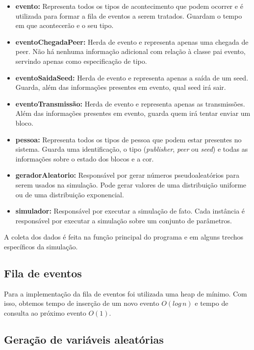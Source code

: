 \documentclass[a4paper,10pt]{article}
\begin{document}
\begin{itemize}
	\item \textbf{evento:} Representa todos os tipos de acontecimento que podem ocorrer e é utilizada para formar a fila de eventos a serem tratados. Guardam o tempo em que acontecerão e o seu tipo.
	\item \textbf{eventoChegadaPeer:} Herda de evento e representa apenas uma chegada de peer. Não há nenhuma informação adicional com relação à classe pai evento, servindo apenas como especificação de tipo.
	\item \textbf{eventoSaidaSeed:} Herda de evento e representa apenas a saída de um seed. Guarda, além das informações presentes em evento, qual seed irá sair.
	\item \textbf{eventoTransmissão:} Herda de evento e representa apenas as transmissões. Além das informações presentes em evento, guarda quem irá tentar enviar um bloco.
	\item \textbf{pessoa:} Representa todos os tipos de pessoa que podem estar presentes no sistema. Guarda uma identificação, o tipo (\textit{publisher}, \textit{peer} ou \textit{seed}) e todas as informações sobre o estado dos blocos e a cor.
	\item \textbf{geradorAleatorio:} Responsável por gerar números pseudoaleatórios para serem usados na simulação. Pode gerar valores de uma distribuição uniforme ou de uma distribuição exponencial.
	\item \textbf{simulador:} Responsável por executar a simulação de fato. Cada instância é responsável por executar a simulação sobre um conjunto de parâmetros.
\end{itemize}

A coleta dos dados é feita na função principal do programa e em alguns trechos específicos da simulação.

\subsection{Fila de eventos}

Para a implementação da fila de eventos foi utilizada uma heap de mínimo. Com isso, obtemos tempo de inserção de um novo evento $O(log\,n)$ e tempo de consulta ao próximo evento $O(1)$.

\subsection{Geração de variáveis aleatórias}
\end{document}
